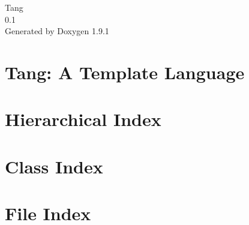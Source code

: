 \let\mypdfximage\pdfximage\def\pdfximage{\immediate\mypdfximage}\documentclass[twoside]{book}
\newcommand{\+}{\discretionary{\mbox{\scriptsize$\hookleftarrow$}}{}{}}
\newcommand{\clearemptydoublepage}{%
  \newpage{\pagestyle{empty}\cleardoublepage}%
}
\begin{document}
\raggedbottom

\hypersetup{pageanchor=false,
             bookmarksnumbered=true,
             pdfencoding=unicode
            }
\begin{titlepage}
\vspace*{7cm}
\begin{center}%
{\Large Tang \\[1ex]\large 0.\+1 }\\
\vspace*{1cm}
{\large Generated by Doxygen 1.9.1}\\
\end{center}
\end{titlepage}
\clearemptydoublepage
{}
\tableofcontents
\clearemptydoublepage
{}
\hypersetup{pageanchor=true}

\chapter{Tang\+: A Template Language}
\label{index}\hypertarget{index}{}
\chapter{Hierarchical Index}

\chapter{Class Index}

\chapter{File Index}

\end{document}

